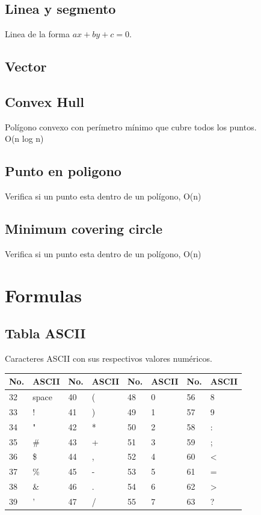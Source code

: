 \documentclass[10pt,landscape,twocolumn,letterpaper,twosided]{article}
\newcommand\cppfile[2][]{

}
\begin{document}
			\subsection{Linea y segmento}
			Linea de la forma $ax + by + c = 0$.
			\cppfile[42-105]{geometria/linea.cpp}
			\subsection{Vector}
			\cppfile[39-70]{geometria/vector.cpp}
			\subsection{Convex Hull}
			Polígono convexo con perímetro mínimo que cubre todos los puntos.\\
			O(n log n)
			\cppfile[48-79]{geometria/convex_hull.cpp}
			\subsection{Punto en poligono}
			Verifica si un punto esta dentro de un polígono, O(n)
			\cppfile[80-103]{geometria/poligono.cpp}
			\subsection{Minimum covering circle}
			Verifica si un punto esta dentro de un polígono, O(n)
			\cppfile[20-60]{geometria/minimum_covering_circle.cpp}
	
	\section{Formulas}

		\subsection{Tabla ASCII}
			Caracteres ASCII con sus respectivos valores numéricos.

		\begin{table}[H]
			\begin{tabular}{|l|l|l|l|l|l|l|l|}
				\hline \textbf{No.} & \textbf{ASCII} & \textbf{No.} & \textbf{ASCII}  &
					\textbf{No.} & \textbf{ASCII} & \textbf{No.} & \textbf{ASCII} \\ \hline
				32 & space & 40 & ( & 48 & 0 & 56 & 8 \\ \hline
				33 &  ! & 41 & ) & 49 & 1 & 57 & 9 \\ \hline
				34 &  " & 42 & * & 50 & 2 & 58 & : \\ \hline
				35 & \# & 43 & + & 51 & 3 & 59 & ; \\ \hline
				36 & \$ & 44 & , & 52 & 4 & 60 & < \\ \hline
				37 & \% & 45 & - & 53 & 5 & 61 & = \\ \hline
				38 & \& & 46 & . & 54 & 6 & 62 & > \\ \hline
				39 &  ' & 47 & / & 55 & 7 & 63 & ? \\ \hline
			\end{tabular}
		\end{table}
		
\end{document}
